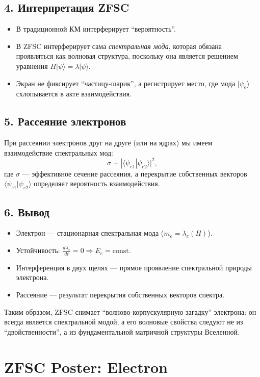 \documentclass[12pt,a4paper]{article}
\begin{document}
\subsection*{4. Интерпретация ZFSC}
\begin{itemize}
  \item В традиционной КМ интерферирует ``вероятность''.  
  \item В ZFSC интерферирует сама \emph{спектральная мода}, которая обязана проявляться как волновая структура, поскольку она является решением уравнения $H|\psi\rangle=\lambda|\psi\rangle$.
  \item Экран не фиксирует ``частицу-шарик'', а регистрирует место, где мода $|\psi_e\rangle$ схлопывается в акте взаимодействия.
\end{itemize}

\subsection*{5. Рассеяние электронов}
При рассеянии электронов друг на друге (или на ядрах) мы имеем взаимодействие спектральных мод:
\[
\sigma \sim |\langle \psi_{e1} | \psi_{e2} \rangle|^2,
\]
где $\sigma$ --- эффективное сечение рассеяния, а перекрытие собственных векторов 
$\langle \psi_{e1}|\psi_{e2}\rangle$ определяет вероятность взаимодействия.

\subsection*{6. Вывод}
\begin{itemize}
  \item Электрон --- стационарная спектральная мода ($m_e=\lambda_e(H)$).
  \item Устойчивость: $\tfrac{d\lambda_e}{dt}=0 \Rightarrow E_e = \text{const}$.
  \item Интерференция в двух щелях --- прямое проявление спектральной природы электрона.
  \item Рассеяние --- результат перекрытия собственных векторов спектра.
\end{itemize}

Таким образом, ZFSC снимает ``волново-корпускулярную загадку'' электрона: 
он всегда является спектральной модой, а его волновые свойства следуют 
не из ``двойственности'', а из фундаментальной матричной структуры Вселенной.

\section*{ZFSC Poster: Electron}
\end{document}
